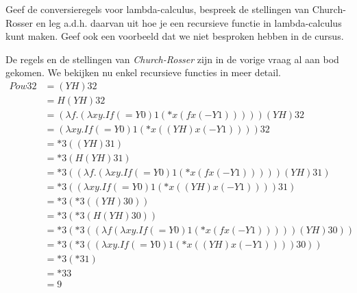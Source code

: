 \begin{quest}[Recursie]
	Geef de conversieregels voor lambda-calculus, bespreek de stellingen van Church-Rosser en leg a.d.h. daarvan uit hoe je een recursieve functie in lambda-calculus kunt maken. Geef ook een voorbeeld dat we niet besproken hebben in de cursus.
\end{quest}

De regels en de stellingen van \emph{Church-Rosser} zijn in de vorige vraag al aan bod gekomen. We bekijken nu enkel recursieve functies in meer detail.\\

\begin{align*}
	Pow 3 2 &= (YH) 3 2
	\\&= H (YH) 3 2
	\\&= (\lambda f . (\lambda xy. If (= Y 0) 1 (* x (f x (- Y 1)))))(YH) 3 2
	\\&= (\lambda xy . If (= Y 0) 1 (* x ((Y H) x (- Y 1)))) 3 2
	\\&= * 3 ((Y H) 3 1)
	\\&= * 3 (H (Y H) 3 1)
	\\&= * 3 ((\lambda f . (\lambda xy . If (= Y 0) 1 (* x (f x (- Y 1)))))(Y H) 3 1)
	\\&= * 3 ((\lambda xy . If (= Y 0) 1 (* x ((YH)x(- Y 1)))) 3 1)
	\\&= * 3 (* 3 ((Y H)3 0))
	\\&= * 3 (* 3 (H(YH) 3 0))
	\\&= * 3 (* 3 ((\lambda f (\lambda xy . If (= Y 0)1(* x(f x(-Y 1)))))(Y H)3 0))
	\\&= * 3 (* 3 ((\lambda xy . If (=Y 0) 1(* x ((Y H)x(- Y 1))))3 0))
	\\&= * 3 (* 3 1)
	\\&= * 3 3
	\\&= 9
\end{align*}
